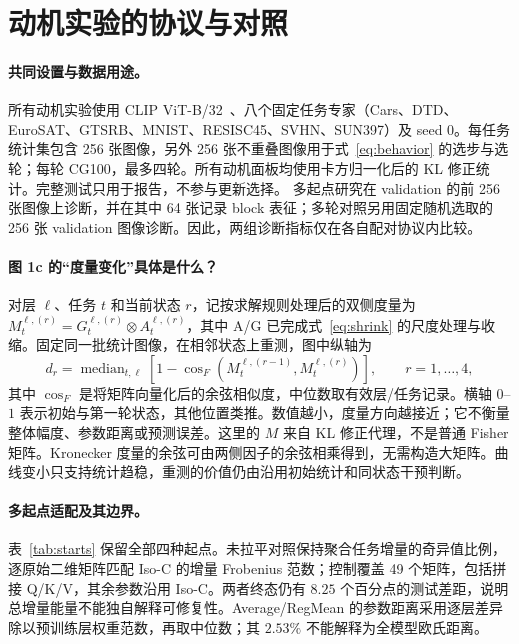 \section{动机实验的协议与对照}
\label{app:protocol}

\paragraph{共同设置与数据用途。}
所有动机实验使用 CLIP ViT-B/32~\citep{radford2021learning}、八个固定任务专家（Cars、DTD、EuroSAT、GTSRB、MNIST、RESISC45、SVHN、SUN397）及 seed 0。每任务统计集包含 256 张图像，另外 256 张不重叠图像用于式~\eqref{eq:behavior} 的选步与选轮；每轮 CG100，最多四轮。所有动机面板均使用卡方归一化后的 KL 修正统计。完整测试只用于报告，不参与更新选择。
多起点研究在 validation 的前 256 张图像上诊断，并在其中 64 张记录 block 表征；多轮对照另用固定随机选取的 256 张 validation 图像诊断。因此，两组诊断指标仅在各自配对协议内比较。

\paragraph{图 1c 的“度量变化”具体是什么？}
对层 $\ell$、任务 $t$ 和当前状态 $r$，记按求解规则处理后的双侧度量为
$M_t^{\ell,(r)}=G_t^{\ell,(r)}\otimes A_t^{\ell,(r)}$，其中 A/G 已完成式~\eqref{eq:shrink} 的尺度处理与收缩。固定同一批统计图像，在相邻状态上重测，图中纵轴为
\begin{equation}
 d_r=\mathop{\mathrm{median}}_{t,\ell}
 \left[1-\cos_F\!\left(M_t^{\ell,(r-1)},M_t^{\ell,(r)}\right)\right],
 \qquad r=1,\ldots,4,
 \label{eq:metric-change}
\end{equation}
其中 $\cos_F$ 是将矩阵向量化后的余弦相似度，中位数取有效层/任务记录。横轴 $0$--$1$ 表示初始与第一轮状态，其他位置类推。数值越小，度量方向越接近；它不衡量整体幅度、参数距离或预测误差。这里的 $M$ 来自 KL 修正代理，不是普通 Fisher 矩阵。Kronecker 度量的余弦可由两侧因子的余弦相乘得到，无需构造大矩阵。曲线变小只支持统计趋稳，重测的价值仍由沿用初始统计和同状态干预判断。

\paragraph{多起点适配及其边界。}
表~\ref{tab:starts} 保留全部四种起点。未拉平对照保持聚合任务增量的奇异值比例，逐原始二维矩阵匹配 Iso-C 的增量 Frobenius 范数；控制覆盖 49 个矩阵，包括拼接 Q/K/V，其余参数沿用 Iso-C。两者终态仍有 $8.25$ 个百分点的测试差距，说明总增量能量不能独自解释可修复性。Average/RegMean 的参数距离采用逐层差异除以预训练层权重范数，再取中位数；其 $2.53\%$ 不能解释为全模型欧氏距离。

